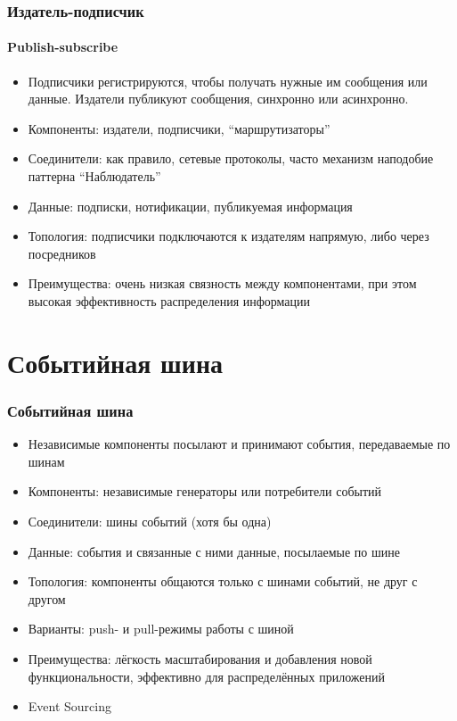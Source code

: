 \documentclass{../../slides-style}
\begin{document}
    \begin{frame}
        \frametitle{Издатель-подписчик}
        \framesubtitle{Publish-subscribe}
        \begin{itemize}
            \item Подписчики регистрируются, чтобы получать нужные им сообщения или данные. Издатели публикуют сообщения, синхронно или асинхронно.
            \item Компоненты: издатели, подписчики, ``маршрутизаторы''
            \item Соединители: как правило, сетевые протоколы, часто механизм наподобие паттерна ``Наблюдатель''
            \item Данные: подписки, нотификации, публикуемая информация
            \item Топология: подписчики подключаются к издателям напрямую, либо через посредников
            \item Преимущества: очень низкая связность между компонентами, при этом высокая эффективность распределения информации
        \end{itemize}
    \end{frame}

    \section{Событийная шина}

    \begin{frame}
        \frametitle{Событийная шина}
        \begin{itemize}
            \item Независимые компоненты посылают и принимают события, передаваемые по шинам
            \item Компоненты: независимые генераторы или потребители событий
            \item Соединители: шины событий (хотя бы одна)
            \item Данные: события и связанные с ними данные, посылаемые по шине
            \item Топология: компоненты общаются только с шинами событий, не друг с другом
            \item Варианты: push- и pull-режимы работы с шиной
            \item Преимущества: лёгкость масштабирования и добавления новой функциональности, эффективно для распределённых приложений
            \item Event Sourcing
        \end{itemize}
    \end{frame}
\end{document}
